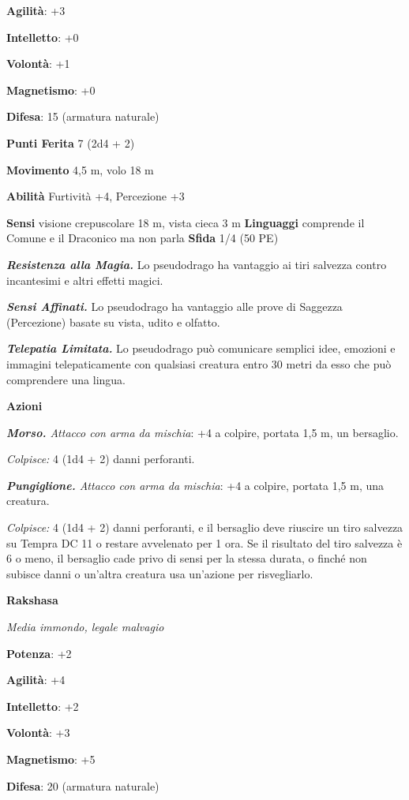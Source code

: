 \begin{multicols}{2}
\textbf{Agilità}: +3

\textbf{Intelletto}: +0

\textbf{Volontà}: +1

\textbf{Magnetismo}: +0

\textbf{Difesa}: 15 (armatura naturale)

\textbf{Punti Ferita} 7 (2d4 + 2)

\textbf{Movimento} 4,5 m, volo 18 m

\textbf{Abilità} Furtività +4, Percezione +3

\textbf{Sensi} visione crepuscolare 18 m, vista cieca 3 m
\textbf{Linguaggi} comprende il Comune e il Draconico ma non parla
\textbf{Sfida} 1/4 (50 PE)

\emph{\textbf{Resistenza alla Magia.}} Lo pseudodrago ha vantaggio ai
tiri salvezza contro incantesimi e altri effetti magici.

\emph{\textbf{Sensi Affinati.}} Lo pseudodrago ha vantaggio alle prove
di Saggezza (Percezione) basate su vista, udito e olfatto.

\emph{\textbf{Telepatia Limitata.}} Lo pseudodrago può comunicare
semplici idee, emozioni e immagini telepaticamente con qualsiasi
creatura entro 30 metri da esso che può comprendere una lingua.

\textbf{Azioni}

\emph{\textbf{Morso.} Attacco con arma da mischia}: +4 a colpire,
portata 1,5 m, un bersaglio.

\emph{Colpisce:} 4 (1d4 + 2) danni perforanti.

\emph{\textbf{Pungiglione.} Attacco con arma da mischia}: +4 a colpire,
portata 1,5 m, una creatura.

\emph{Colpisce:} 4 (1d4 + 2) danni perforanti, e il bersaglio deve
riuscire un tiro salvezza su Tempra DC 11 o restare avvelenato per
1 ora. Se il risultato del tiro salvezza è 6 o meno, il bersaglio cade
privo di sensi per la stessa durata, o finché non subisce danni o
un'altra creatura usa un'azione per risvegliarlo.


\textbf{Rakshasa}

\emph{Media immondo, legale malvagio}

\textbf{Potenza}: +2

\textbf{Agilità}: +4

\textbf{Intelletto}: +2

\textbf{Volontà}: +3

\textbf{Magnetismo}: +5

\textbf{Difesa}: 20 (armatura naturale)


\end{multicols}
